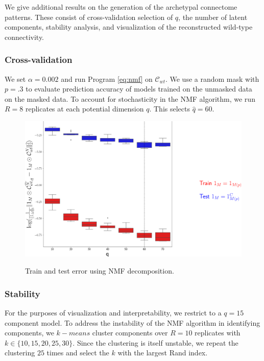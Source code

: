 We give additional results on the generation of the archetypal connectome patterns.
These consist of cross-validation selection of $q$, the number of latent components, stability analysis, and visualization of the reconstructed wild-type connectivity.

\subsubsection{Cross-validation}

We set $\alpha = 0.002$ and run Program \ref{eq:nmf} on $\mathcal C_{wt}$.
We use a random mask with $p = .3$ to evaluate prediction accuracy of models trained on the unmasked data on the masked data.
To account for stochasticity in the NMF algorithm, we run $R = 8$ replicates at each potential dimension $q$.
This selects $\hat q = 60$.

\begin{figure}[H]
    \centering
    \includegraphics[width = 5in]{figs/nmf_test_train.png} 
    \label{fig:train_test}
    \caption{Train and test error using NMF decomposition.}
\end{figure}

\newpage

\subsubsection{Stability}

For the purposes of visualization and interpretability, we restrict to a $q = 15$ component model.
To address the instability of the NMF algorithm in identifying components, we $k-means$ cluster components over $R = 10$ replicates with $k \in \{10,15,20, 25, 30\}$.
Since the clustering is itself unstable, we repeat the clustering $25$ times and select the $k$ with the largest Rand index.

